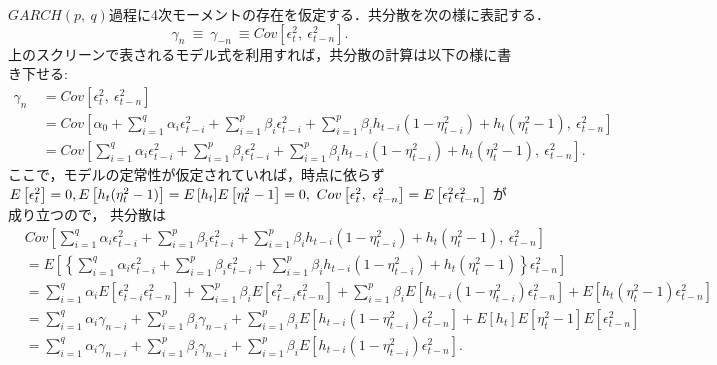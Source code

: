 \documentclass[8pt]{jsarticle}
\def\Exp#1{\mbox{$E \left[ #1 \right]$}}
\def\Cov#1#2{\mbox{$Cov \left[ #1,\ #2 \right]$}}
\begin{document}
\begin{breakbox}
	{}\\
	$GARCH(p,\ q) 過程に 4 次モーメントの存在を仮定する．共分散を次の様に表記する．$
	\[
		\gamma_n\ \equiv\ \gamma_{-n}\ \equiv \Cov{\epsilon_t^2}{\epsilon_{t-n}^2}.
	\]
	上のスクリーンで表されるモデル式を利用すれば，共分散の計算は以下の様に書き下せる:
	\begin{align*}
		\gamma_n\ &= \Cov{\epsilon_t^2}{\epsilon_{t-n}^2} \\
		&= \Cov{\alpha_0 + \sum\limits_{i=1}^{q} \alpha_i \epsilon_{t-i}^2 
			+ \sum\limits_{i=1}^{p} \beta_i \epsilon_{t-i}^2 
			+ \sum\limits_{i=1}^{p} \beta_i h_{t-i}(1 - \eta_{t-i}^2) + h_t(\eta_t^2 - 1)}{\epsilon_{t-n}^2} \\
		&= \Cov{\sum\limits_{i=1}^{q} \alpha_i \epsilon_{t-i}^2 
			+ \sum\limits_{i=1}^{p} \beta_i \epsilon_{t-i}^2 
			+ \sum\limits_{i=1}^{p} \beta_i h_{t-i}(1 - \eta_{t-i}^2) + h_t(\eta_t^2 - 1)}{\epsilon_{t-n}^2}.
	\end{align*}
	ここで，モデルの定常性が仮定されていれば，時点に依らず $\Exp{\epsilon_t^2} = 0,\\
	\Exp{h_t(\eta_t^2 - 1)} = \Exp{h_t}\Exp{\eta_t^2 - 1} = 0,\ \Cov{\epsilon_t^2}{\epsilon_{t-n}^2} = \Exp{\epsilon_t^2 \epsilon_{t-n}^2}$
	が成り立つので，
	共分散は
	\begin{align*}
		&\Cov{\sum\limits_{i=1}^{q} \alpha_i \epsilon_{t-i}^2 
			+ \sum\limits_{i=1}^{p} \beta_i \epsilon_{t-i}^2 
			+ \sum\limits_{i=1}^{p} \beta_i h_{t-i}(1 - \eta_{t-i}^2) + h_t(\eta_t^2 - 1)}{\epsilon_{t-n}^2} \\
		&= \Exp{\left\{ 
			\sum\limits_{i=1}^{q} \alpha_i \epsilon_{t-i}^2 
			+ \sum\limits_{i=1}^{p} \beta_i \epsilon_{t-i}^2 
			+ \sum\limits_{i=1}^{p} \beta_i h_{t-i}(1 - \eta_{t-i}^2) + h_t(\eta_t^2 - 1)
			\right\} \epsilon_{t-n}^2} \\
		&= \sum_{i=1}^{q} \alpha_i \Exp{\epsilon_{t-i}^2 \epsilon_{t-n}^2}
			+ \sum_{i=1}^{p} \beta_i \Exp{\epsilon_{t-i}^2 \epsilon_{t-n}^2}
			+ \sum_{i=1}^{p} \beta_i \Exp{h_{t-i}(1 - \eta_{t-i}^2) \epsilon_{t-n}^2} + \Exp{h_t(\eta_t^2 - 1) \epsilon_{t-n}^2} \\
		&= \sum_{i=1}^{q} \alpha_i \gamma_{n - i} 
			+ \sum_{i=1}^{p} \beta_i \gamma_{n - i} 
			+ \sum_{i=1}^{p} \beta_i \Exp{h_{t-i}(1 - \eta_{t-i}^2) \epsilon_{t-n}^2} + \Exp{h_t}\Exp{\eta_t^2 - 1}\Exp{\epsilon_{t-n}^2} \\
		&= \sum_{i=1}^{q} \alpha_i \gamma_{n - i} 
			+ \sum_{i=1}^{p} \beta_i \gamma_{n - i}  
			+ \sum_{i=1}^{p} \beta_i \Exp{h_{t-i}(1 - \eta_{t-i}^2) \epsilon_{t-n}^2}.

\end{align*}
\end{breakbox}
\end{document}
